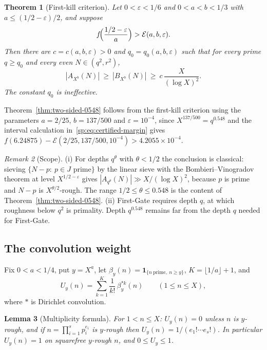 \documentclass[final,11pt]{elsarticle}
\newtheorem{theorem}{Theorem}[section]
\newtheorem{lemma}[theorem]{Lemma}
\theoremstyle{definition}
\theoremstyle{remark}
\newtheorem{remark}[theorem]{Remark}
\newcommand{\one}{\mathbf1}
\newcommand{\E}{\mathcal E}
\numberwithin{equation}{section}
\begin{document}
\begin{theorem}[First-kill criterion]\label{sp:thm:criterion}
Let $0<\varepsilon<1/6$ and $0<a<b<1/3$ with $a\le(1/2-\varepsilon)/2$, and suppose
\begin{equation}\label{sp:eq:criterion}
 f\!\Bigl(\frac{1/2-\varepsilon}{a}\Bigr)>\E(a,b,\varepsilon).
\end{equation}
Then there are $c=c(a,b,\varepsilon)>0$ and $q_0=q_0(a,b,\varepsilon)$ such that for every
prime $q\ge q_0$ and every even $N\in(q^2,r^2)$,
\[
 |A_{X^b}(N)|\ \ge\ |B_{X^b}(N)|\ \ge\ c\,\frac{X}{(\log X)^2}.
\]
The constant $q_0$ is ineffective.
\end{theorem}

Theorem~\ref{thm:two-sided-0548} follows from the first-kill criterion using the parameters
$a=2/25$, $b=137/500$ and $\varepsilon=10^{-4}$, since
$X^{137/500}=q^{0.548}$ and the interval calculation in~\eqref{sp:eq:certified-margin} gives
$f(6.24875)-\mathcal E(2/25,137/500,10^{-4})>4.2055\times10^{-4}$.

\begin{remark}[Scope]\label{sp:rem:scope}
(i) For depths $q^\theta$ with $\theta<1/2$ the conclusion is classical: sieving
$\{N-p:\ p\in J\text{ prime}\}$ by the linear sieve with the
Bombieri--Vinogradov theorem at level $X^{1/2-\varepsilon}$ gives
$|A_{q^\theta}(N)|\gg X/(\log X)^2$, because $p$ is prime and $N-p$ is
$X^{\theta/2}$-rough. The range $1/2\le\theta\le0.548$ is the content of
Theorem~\ref{thm:two-sided-0548}.
(ii) First-Gate requires depth $q$, at which roughness below $q^2$ is primality.
Depth $q^{0.548}$ remains far from the depth $q$ needed for First-Gate.
\end{remark}

\subsection{The convolution weight}\label{sp:sec:weight}

Fix $0<a<1/4$, put $y=X^a$, let $\beta_y(n)=\one_{\{n\ \mathrm{prime},\ n\ge y\}}$,
$K=\lfloor1/a\rfloor+1$, and
\begin{equation}\label{sp:eq:U}
 U_y(n)=\sum_{k=1}^K\frac1{k!}\,\beta_y^{*k}(n)\qquad(1\le n\le X),
\end{equation}
where $*$ is Dirichlet convolution.

\begin{lemma}[Multiplicity formula]\label{sp:lem:weight}
For $1<n\le X$: $U_y(n)=0$ unless $n$ is $y$-rough, and if
$n=\prod_{i=1}^s p_i^{e_i}$ is $y$-rough then $U_y(n)=1/(e_1!\cdots e_s!)$.
In particular $U_y(n)=1$ on squarefree $y$-rough $n$, and $0\le U_y\le1$.
\end{lemma}
\end{document}
